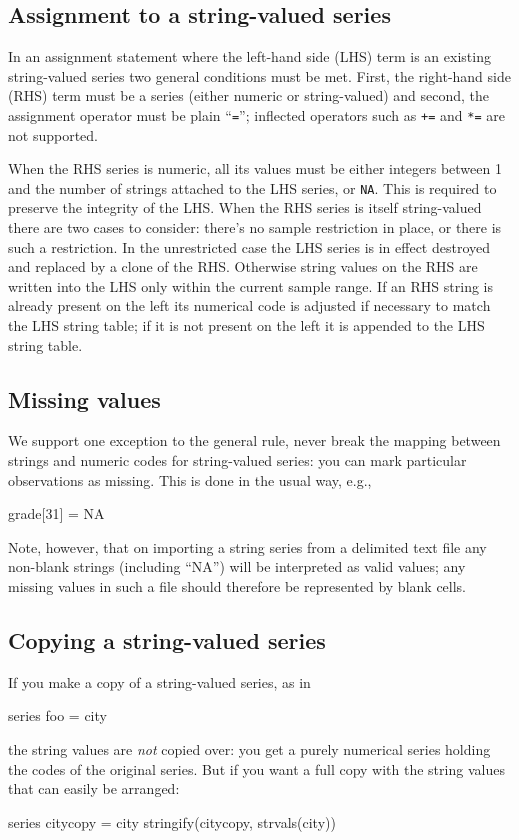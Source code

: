 \subsection{Assignment to a string-valued series}

In an assignment statement where the left-hand side (LHS) term is an
existing string-valued series two general conditions must be
met. First, the right-hand side (RHS) term must be a series (either
numeric or string-valued) and second, the assignment operator must be
plain ``\texttt{=}''; inflected operators such as \texttt{+=} and
\texttt{*=} are not supported.

When the RHS series is numeric, all its values must be either integers
between 1 and the number of strings attached to the LHS series, or
\texttt{NA}. This is required to preserve the integrity of the LHS.
When the RHS series is itself string-valued there are two cases to
consider: there's no sample restriction in place, or there is such a
restriction. In the unrestricted case the LHS series is in effect
destroyed and replaced by a clone of the RHS. Otherwise string values
on the RHS are written into the LHS only within the current sample
range. If an RHS string is already present on the left its numerical
code is adjusted if necessary to match the LHS string table; if it is
not present on the left it is appended to the LHS string table.

\subsection{Missing values}

We support one exception to the general rule, never break the mapping
between strings and numeric codes for string-valued series: you can
mark particular observations as missing. This is done in the usual
way, e.g.,
\begin{code}
grade[31] = NA
\end{code}
Note, however, that on importing a string series from a delimited text
file any non-blank strings (including ``NA'') will be interpreted as
valid values; any missing values in such a file should therefore be
represented by blank cells.

\subsection{Copying a string-valued series}

If you make a copy of a string-valued series, as in
\begin{code}
series foo = city
\end{code}
the string values are \textit{not} copied over: you get a purely
numerical series holding the codes of the original series. But if you
want a full copy with the string values that can easily be arranged:
\begin{code}
series citycopy = city
stringify(citycopy, strvals(city))
\end{code}


